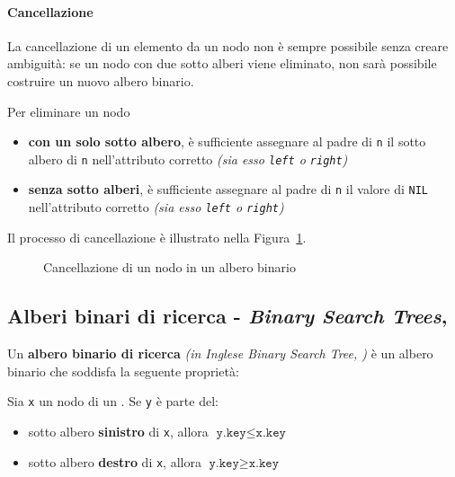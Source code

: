 \documentclass[italian, 10pt]{article}
\begin{document}
\paragraph{Cancellazione}
\label{par:cancellazione-albero-binario}

La cancellazione di un elemento da un nodo non è sempre possibile senza creare ambiguità: se un nodo con due sotto alberi viene eliminato, non sarà possibile costruire un nuovo albero binario.

Per eliminare un nodo

\begin{itemize}
  \item \textbf{con un solo sotto albero}, è sufficiente assegnare al padre di \texttt{n} il sotto albero di \texttt{n} nell'attributo corretto \textit{(sia esso \texttt{left} o \texttt{right})}
  \item \textbf{senza sotto alberi}, è sufficiente assegnare al padre di \texttt{n} il valore di \texttt{NIL} nell'attributo corretto \textit{(sia esso \texttt{left} o \texttt{right})}
\end{itemize}

\bigskip
Il processo di cancellazione è illustrato nella Figura~\ref{fig:cancellazione-albero-binario}.

\begin{figure}[htbp]
  \bigskip
  \centering
  \caption{Cancellazione di un nodo in un albero binario}
  \label{fig:cancellazione-albero-binario}
  \bigskip
\end{figure}

\subsection{Alberi binari di ricerca - \textit{Binary Search Trees}, \BST}

Un \textbf{albero binario di ricerca} \textit{(in Inglese Binary Search Tree, \BST)} è un albero binario che soddisfa la seguente proprietà:

Sia \texttt{x} un nodo di un \BST.
Se \texttt{y} è parte del:

\begin{itemize}
  \item sotto albero \textbf{sinistro} di \texttt{x}, allora \(\texttt{y.key} \leq \texttt{x.key}\)
  \item sotto albero \textbf{destro} di \texttt{x}, allora \(\texttt{y.key} \geq \texttt{x.key}\)
\end{itemize}
\end{document}
